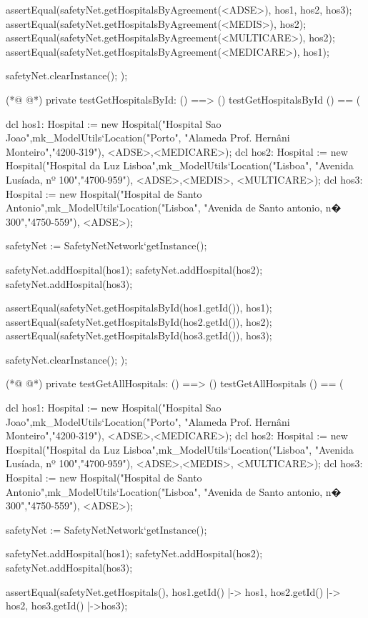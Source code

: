 \begin{vdmpp}[breaklines=true]
  assertEqual(safetyNet.getHospitalsByAgreement(<ADSE>), {hos1, hos2, hos3});
  assertEqual(safetyNet.getHospitalsByAgreement(<MEDIS>), {hos2});
  assertEqual(safetyNet.getHospitalsByAgreement(<MULTICARE>), {hos2});
  assertEqual(safetyNet.getHospitalsByAgreement(<MEDICARE>), {hos1});
  
  safetyNet.clearInstance();
);

(*@
\label{testGetHospitalsById:355}
@*)
private testGetHospitalsById: () ==> ()
 testGetHospitalsById () == (
   
  dcl hos1: Hospital := new Hospital("Hospital Sao Joao",mk_ModelUtils`Location("Porto", "Alameda Prof. Hernâni Monteiro","4200-319"), {<ADSE>,<MEDICARE>});
  dcl hos2: Hospital := new Hospital("Hospital da Luz Lisboa",mk_ModelUtils`Location("Lisboa", "Avenida Lusíada, nº 100","4700-959"), {<ADSE>,<MEDIS>, <MULTICARE>});
  dcl hos3: Hospital := new Hospital("Hospital de Santo Antonio",mk_ModelUtils`Location("Lisboa", "Avenida de Santo antonio, n� 300","4750-559"), {<ADSE>});
  
  safetyNet := SafetyNetNetwork`getInstance();
   
  safetyNet.addHospital(hos1);
  safetyNet.addHospital(hos2);
  safetyNet.addHospital(hos3);
 
  assertEqual(safetyNet.getHospitalsById(hos1.getId()), hos1);
  assertEqual(safetyNet.getHospitalsById(hos2.getId()), hos2);
  assertEqual(safetyNet.getHospitalsById(hos3.getId()), hos3);
 
  safetyNet.clearInstance();
);

(*@
\label{testGetAllHospitals:375}
@*)
private testGetAllHospitals: () ==> ()
 testGetAllHospitals () == (
  
  dcl hos1: Hospital := new Hospital("Hospital Sao Joao",mk_ModelUtils`Location("Porto", "Alameda Prof. Hernâni Monteiro","4200-319"), {<ADSE>,<MEDICARE>});
  dcl hos2: Hospital := new Hospital("Hospital da Luz Lisboa",mk_ModelUtils`Location("Lisboa", "Avenida Lusíada, nº 100","4700-959"), {<ADSE>,<MEDIS>, <MULTICARE>});
  dcl hos3: Hospital := new Hospital("Hospital de Santo Antonio",mk_ModelUtils`Location("Lisboa", "Avenida de Santo antonio, n� 300","4750-559"), {<ADSE>});
  
  safetyNet := SafetyNetNetwork`getInstance();
   
  safetyNet.addHospital(hos1);
  safetyNet.addHospital(hos2);
  safetyNet.addHospital(hos3);
 
  assertEqual(safetyNet.getHospitals(), {hos1.getId() |-> hos1, hos2.getId() |-> hos2, hos3.getId() |->hos3});
 

\end{vdmpp}
